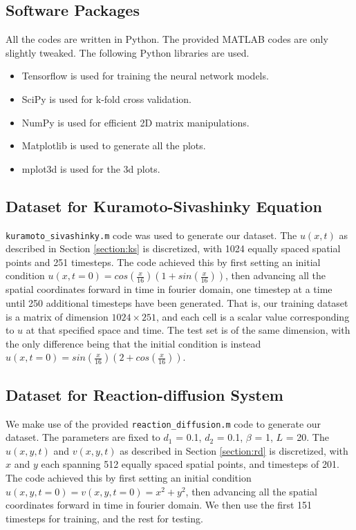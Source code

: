 \documentclass[letterpaper, 10 pt, conference]{ieeeconf}  %
\begin{document}
\subsection{Software Packages}
All the codes are written in Python. The provided MATLAB codes are only slightly tweaked. The following Python libraries are used.
\begin{itemize}
    \item Tensorflow is used for training the neural network models.
    \item SciPy is used for k-fold cross validation.
    \item NumPy is used for efficient 2D matrix manipulations.
    \item Matplotlib is used to generate all the plots.
    \item mplot3d is used for the 3d plots.
\end{itemize}

\subsection{Dataset for Kuramoto-Sivashinky Equation}
\label{section:data_ks}
\texttt{kuramoto\_sivashinky.m} code was used to generate our dataset.
The $u(x,t)$ as described in Section \ref{section:ks} is discretized, with 1024 equally spaced spatial points and 251 timesteps. The code achieved this by first setting an initial condition $u(x, t=0) = cos(\frac{x}{16}) (1+sin(\frac{x}{16}))$, then advancing all the spatial coordinates forward in time in fourier domain, one timestep at a time until 250 additional timesteps have been generated. That is, our training dataset is a matrix of dimension $1024 \times 251$, and each cell is a scalar value corresponding to $u$ at that specified space and time. The test set is of the same dimension, with the only difference being that the initial condition is instead $u(x, t=0) = sin(\frac{x}{16}) (2+cos(\frac{x}{16}))$.

\subsection{Dataset for Reaction-diffusion System}
\label{section:data_rd}
We make use of the provided \texttt{reaction\_diffusion.m} code to generate our dataset. 
The parameters are fixed to $d_1$ = 0.1, $d_2$ = 0.1, $\beta$ = 1, $L$ = 20.
The $u(x,y,t)$ and $v(x,y,t)$ as described in Section \ref{section:rd} is discretized, with $x$ and $y$ each spanning 512 equally spaced spatial points, and timesteps of 201. The code achieved this by first setting an initial condition $u(x, y, t=0) = v(x,y,t=0) = x^2 + y^2$, then advancing all the spatial coordinates forward in time in fourier domain. We then use the first 151 timesteps for training, and the rest for testing.
\end{document}
